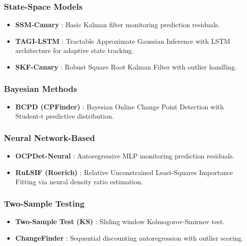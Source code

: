 \documentclass[journal,article,submit,pdftex,moreauthors]{Definitions/mdpi}
\begin{document}
\subsubsection{State-Space Models}

\begin{itemize}
    \item \textbf{SSM-Canary} \cite{canary2023}: Basic Kalman filter monitoring prediction residuals.
    
    \item \textbf{TAGI-LSTM} \cite{tagi2023}: Tractable Approximate Gaussian Inference with LSTM architecture for adaptive state tracking.
    
    \item \textbf{SKF-Canary} \cite{canary2023}: Robust Square Root Kalman Filter with outlier handling.
\end{itemize}

\subsubsection{Bayesian Methods}

\begin{itemize}
    \item \textbf{BCPD (CPFinder)} \cite{adams2007bayesian}: Bayesian Online Change Point Detection with Student-t predictive distribution.
\end{itemize}

\subsubsection{Neural Network-Based}

\begin{itemize}
    \item \textbf{OCPDet-Neural} \cite{ocpdet2022}: Autoregressive MLP monitoring prediction residuals.
    
    \item \textbf{RuLSIF (Roerich)} \cite{roerich2021}: Relative Unconstrained Least-Squares Importance Fitting via neural density ratio estimation.
\end{itemize}

\subsubsection{Two-Sample Testing}

\begin{itemize}
    \item \textbf{Two-Sample Test (KS)} \cite{ross2011two}: Sliding window Kolmogorov-Smirnov test.
    
    \item \textbf{ChangeFinder} \cite{takeuchi2006unifying}: Sequential discounting autoregression with outlier scoring.
\end{itemize}
\end{document}
